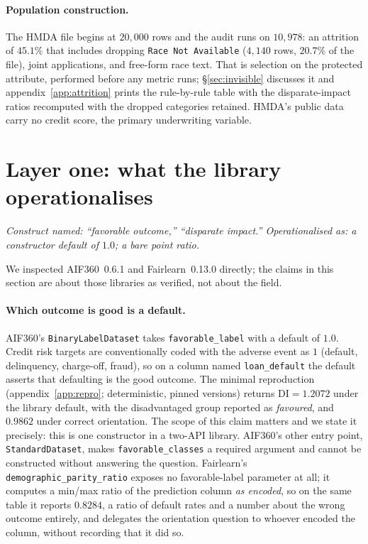 \documentclass[sigconf,nonacm]{acmart}
\begin{document}
\paragraph{Population construction.} The HMDA file begins at $20{,}000$ rows
and the audit runs on $10{,}978$: an attrition of $45.1\%$ that includes
dropping \texttt{Race Not Available} ($4{,}140$ rows, $20.7\%$ of the file),
joint applications, and free-form race text. That is selection on the
protected attribute, performed before any metric runs; \S\ref{sec:invisible}
discusses it and appendix~\ref{app:attrition} prints the rule-by-rule table
with the disparate-impact ratios recomputed with the dropped categories
retained. HMDA's public data carry no credit score, the primary underwriting
variable.

\section{Layer one: what the library operationalises}
\label{sec:library}

\emph{Construct named: ``favorable outcome,'' ``disparate impact.''
Operationalised as: a constructor default of $1.0$; a bare point ratio.}

We inspected AIF360~0.6.1 and Fairlearn~0.13.0 directly; the claims in this
section are about those libraries as verified, not about the field.

\paragraph{Which outcome is good is a default.} AIF360's
\texttt{BinaryLabelDataset} takes \texttt{favorable\_label} with a default of
$1.0$. Credit risk targets are conventionally coded with the adverse event as
$1$ (default, delinquency, charge-off, fraud), so on a column named
\texttt{loan\_default} the default asserts that defaulting is the good
outcome. The minimal reproduction (appendix~\ref{app:repro}; deterministic,
pinned versions) returns $\mathrm{DI}=1.2072$ under the library default, with
the disadvantaged group reported as \emph{favoured}, and $0.9862$ under
correct orientation. The scope of this claim matters and we state it
precisely: this is one constructor in a two-API library. AIF360's other entry
point, \texttt{StandardDataset}, makes \texttt{favorable\_classes} a required
argument and cannot be constructed without answering the question. Fairlearn's
\texttt{demographic\_parity\_ratio} exposes no favorable-label parameter at
all; it computes a min/max ratio of the prediction column \emph{as encoded},
so on the same table it reports $0.8284$, a ratio of default rates and a
number about the wrong outcome entirely, and delegates the orientation
question to whoever encoded the column, without recording that it did so.
\end{document}
